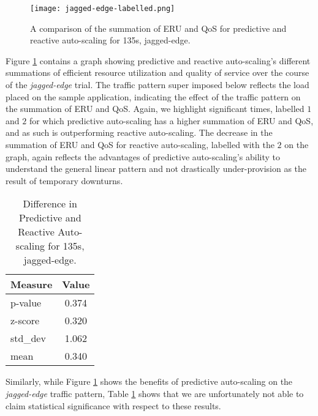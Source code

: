 \begin{figure}[!h]
  \centerline{\texttt{[image: jagged-edge-labelled.png]}}
  \caption{A comparison of the summation of ERU and QoS for
    predictive and reactive auto-scaling for 135s, jagged-edge.}
  \label{fig:135s-jagged-edge-labelled}
\end{figure}


Figure \ref{fig:135s-jagged-edge-labelled} contains a graph
showing predictive and reactive auto-scaling's different
summations of efficient resource utilization and quality of service over the
course of the \textit{jagged-edge} trial.
The traffic pattern super imposed below reflects the load
placed on the sample application, indicating the effect of the traffic pattern
on the summation of ERU and QoS. Again, we highlight significant times, labelled
$1$ and $2$ for which
predictive auto-scaling has a higher summation of ERU and QoS, and as such is
outperforming reactive auto-scaling. The decrease in the summation of ERU and
QoS for reactive auto-scaling, labelled with the $2$ on the graph, again
reflects the advantages of predictive auto-scaling's ability to understand the
general linear pattern and not drastically under-provision as the result of
temporary downturns.

\begin{table}[htbp]
  \centering
  \caption{Difference in Predictive and Reactive Auto-scaling for 135s,
  jagged-edge.}
  \label{tab:135s-jagged-edge}
\begin{tabular}{l c}\hline\hline
    \multicolumn{1}{c}{\textbf{Measure}} & \textbf{Value} \\ \hline
     p-value & 0.374 \\
     z-score & 0.320 \\
     std\_dev & 1.062 \\
     mean & 0.340
  \end{tabular}
\end{table}

Similarly, while Figure \ref{fig:135s-jagged-edge-labelled} shows the benefits of predictive
auto-scaling on the \textit{jagged-edge} traffic pattern, Table
\ref{tab:135s-jagged-edge} shows that we are unfortunately not able to claim
statistical significance with respect to these results.
